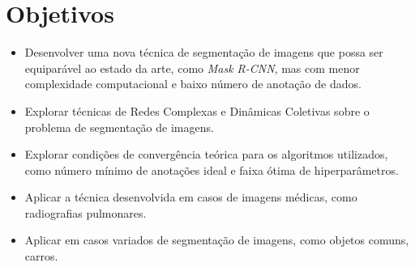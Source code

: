 \chapter{Objetivos}\label{cap:objetivos}

\begin{itemize}
\item Desenvolver uma nova técnica de segmentação de imagens que possa ser
equiparável ao estado da arte, como \textit{Mask R-CNN}, mas com menor
complexidade computacional e baixo número de anotação de dados.
\item Explorar técnicas de Redes Complexas e Dinâmicas Coletivas sobre
  o problema de segmentação de imagens.
\item Explorar condições de convergência teórica para os algoritmos
utilizados, como número mínimo de anotações ideal e faixa ótima de
hiperparâmetros.
\item Aplicar a técnica desenvolvida em casos de imagens médicas, como
  radiografias pulmonares.
\item Aplicar em casos variados de segmentação de imagens, como
  objetos comuns, carros.
\end{itemize}
